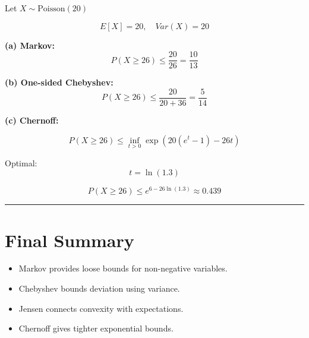 \documentclass[11pt]{article}
\begin{document}
Let $X \sim \text{Poisson}(20)$

\[
E[X] = 20, \quad Var(X) = 20
\]

\textbf{(a) Markov:}
\[
P(X \ge 26) \le \frac{20}{26} = \frac{10}{13}
\]

\textbf{(b) One-sided Chebyshev:}
\[
P(X \ge 26) \le \frac{20}{20+36} = \frac{5}{14}
\]

\textbf{(c) Chernoff:}

\[
P(X \ge 26) \le \inf_{t>0} \exp(20(e^t -1) - 26t)
\]

Optimal:
\[
t = \ln(1.3)
\]

\[
P(X \ge 26) \le e^{6 - 26\ln(1.3)} \approx 0.439
\]

\hrule

\section*{Final Summary}

\begin{itemize}
\item Markov provides loose bounds for non-negative variables.
\item Chebyshev bounds deviation using variance.
\item Jensen connects convexity with expectations.
\item Chernoff gives tighter exponential bounds.
\end{itemize}
\end{document}
